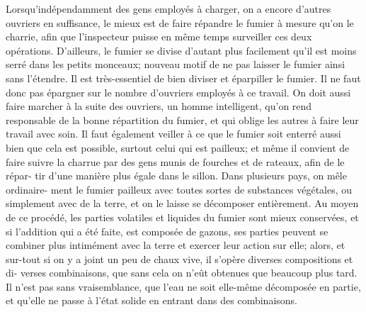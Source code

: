 Lorsqu'indépendamment des gens employés à charger, on a encore d'autres ouvriers en suffisance, le mieux est de faire répandre le fumier à mesure qu'on le charrie, afin que l'inspecteur puisse en même temps surveiller ces deux opérations. D'ailleurs, le fumier se divise d'autant plus facilement qu'il est moins serré dans les petits monceaux; nouveau motif de ne pas laisser le fumier ainsi sans l'étendre.
Il est très-essentiel de bien diviser et éparpiller le fumier. Il ne faut donc pas épargner sur le nombre d'ouvriers employés à ce travail. On doit aussi faire marcher à la suite des ouvriers, un homme intelligent, qu'on rend responsable de la bonne répartition du fumier, et qui oblige les autres à faire leur travail avec soin. Il faut également veiller à ce que le fumier soit enterré aussi bien que cela est possible, surtout celui qui est pailleux; et même il convient de faire suivre la charrue par des gens munis de\setcounter{page}{53} fourches et de rateaux, afin de le répar- tir d'une manière plus égale dans le sillon.
Dans plusieurs pays, on mêle ordinaire- ment le fumier pailleux avec toutes sortes de substances végétales, ou simplement avec de la terre, et on le laisse se décomposer entièrement. Au moyen de ce procédé, les parties volatiles et liquides du fumier sont mieux conservées, et si l'addition qui a été faite, est composée de gazons, ses parties peuvent se combiner plus intimément avec la terre et exercer leur action sur elle; alors, et sur-tout si on y a joint un peu de chaux vive, il s'opère diverses compositions et di- verses combinaisons, que sans cela on n'eût obtenues que beaucoup plus tard. Il n'est pas sans vraisemblance, que l'eau ne soit elle-même décomposée en partie, et qu'elle ne passe à l'état solide en entrant dans des combinaisons.
